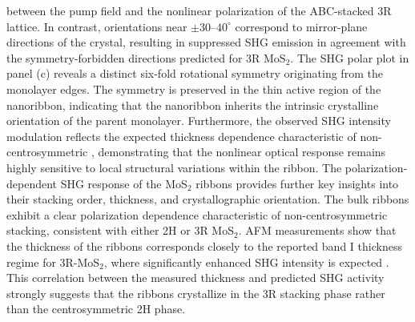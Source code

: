 \documentclass[journal=jacsnano,manuscript=article]{achemso}
\begin{document}
between the pump field and the nonlinear polarization of the ABC-stacked 3R lattice. In contrast, orientations near $\pm 30$--$40^\circ$ correspond to mirror-plane directions of the crystal, resulting in suppressed SHG emission in agreement with the symmetry-forbidden directions predicted for 3R MoS$_2$. The SHG polar plot in panel (c) reveals a distinct six-fold rotational symmetry originating from the  monolayer edges. The symmetry is preserved in the thin active region of the nanoribbon, indicating that the nanoribbon inherits the intrinsic crystalline orientation of the parent monolayer. Furthermore, the observed SHG intensity modulation reflects the expected thickness dependence characteristic of non-centrosymmetric , demonstrating that the nonlinear optical response remains highly sensitive to local structural variations within the ribbon. The polarization-dependent SHG response of the MoS$_2$ ribbons provides further key insights into their stacking order, thickness, and crystallographic orientation. The bulk ribbons exhibit a clear polarization dependence characteristic of non-centrosymmetric stacking, consistent with either 2H or 3R MoS$_2$. AFM measurements show that the thickness of the ribbons corresponds closely to the reported band I thickness regime for 3R-MoS$_2$, where significantly enhanced SHG intensity is expected \cite{Shi2017}. This correlation between the measured thickness and predicted SHG activity strongly suggests that the ribbons crystallize in the 3R stacking phase rather than the centrosymmetric 2H phase.
\end{document}
